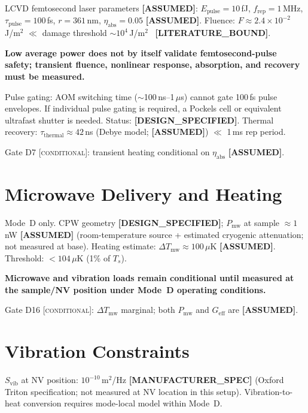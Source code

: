 \documentclass[12pt,a4paper]{article}
\newcommand{\conditional}{\textsc{conditional}}
\newcommand{\assumed}{\textbf{[ASSUMED]}}
\newcommand{\designspec}{\textbf{[DESIGN\_SPECIFIED]}}
\newcommand{\mfrspec}{\textbf{[MANUFACTURER\_SPEC]}}
\newcommand{\litbound}{\textbf{[LITERATURE\_BOUND]}}
\begin{document}
LCVD femtosecond laser parameters \assumed{}: $E_\mathrm{pulse}=10$\,fJ,
$f_\mathrm{rep}=1$\,MHz, $\tau_\mathrm{pulse}=100$\,fs, $r=361$\,nm,
$\eta_\mathrm{abs}=0.05$ \assumed{}.
Fluence: $F \approx 2.4\times10^{-2}$\,J/m$^2$ $\ll$ damage threshold
$\sim10^4$\,J/m$^2$~\cite{Ozkan2012,Shinoda2009} \litbound{}.

\textbf{Low average power does not by itself validate femtosecond-pulse safety;
transient fluence, nonlinear response, absorption, and recovery must be measured.}

Pulse gating: AOM switching time ($\sim$100\,ns--1\,$\mu$s) cannot gate
100\,fs pulse envelopes.
If individual pulse gating is required, a Pockels cell or equivalent ultrafast
shutter is needed.
Status: \designspec{}.
Thermal recovery: $\tau_\mathrm{thermal} \approx 42$\,ns (Debye model; \assumed{})
$\ll$ 1\,ms rep period.

Gate D7 [\conditional{}]: transient heating conditional on $\eta_\mathrm{abs}$ \assumed{}.

\section{Microwave Delivery and Heating}
\label{sec:mw}

Mode~D only.
CPW geometry \designspec{}; $P_\mathrm{mw}$ at sample $\approx 1$\,nW \assumed{}
(room-temperature source + estimated cryogenic attenuation; not measured at base).
Heating estimate: $\Delta T_\mathrm{mw} \approx 100\,\mu$K \assumed{}.
Threshold: $<104\,\mu$K (1\% of $T_s$).

\textbf{Microwave and vibration loads remain conditional until measured at the
sample/NV position under Mode~D operating conditions.}

Gate D16 [\conditional{}]: $\Delta T_\mathrm{mw}$ marginal; both $P_\mathrm{mw}$
and $G_\mathrm{eff}$ are \assumed{}.

\section{Vibration Constraints}
\label{sec:vib}

$S_\mathrm{vib}$ at NV position: $10^{-10}$\,m$^2$/Hz \mfrspec{}
(Oxford Triton specification; not measured at NV location in this setup).
Vibration-to-heat conversion requires mode-local model within Mode~D.
\end{document}

